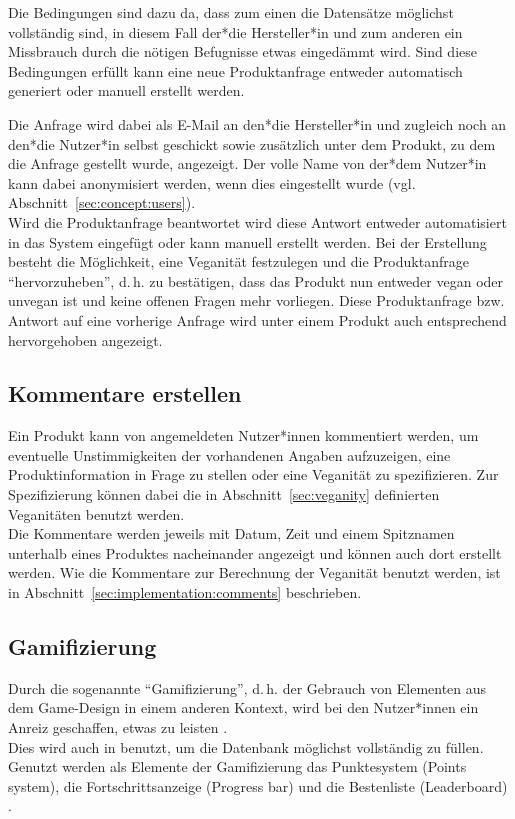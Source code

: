 Die Bedingungen sind dazu da, dass zum einen die Datensätze möglichst
vollständig sind, in diesem Fall der*die Hersteller*in und zum anderen
ein Missbrauch durch die nötigen Befugnisse etwas eingedämmt wird.
Sind diese Bedingungen erfüllt kann eine neue Produktanfrage entweder 
automatisch generiert oder manuell erstellt werden.

Die Anfrage wird dabei als E-Mail an den*die
Hersteller*in
und zugleich noch an den*die Nutzer*in selbst geschickt
sowie zusätzlich unter dem Produkt, zu
dem die Anfrage gestellt wurde, angezeigt.
Der volle Name von der*dem 
Nutzer*in kann dabei anonymisiert werden, wenn dies eingestellt wurde (vgl. 
Abschnitt~\ref{sec:concept:users}).\\
Wird die Produktanfrage beantwortet wird diese Antwort entweder automatisiert
in das System eingefügt oder kann manuell erstellt werden.
Bei der Erstellung besteht die Möglichkeit, eine Veganität festzulegen und die
Produktanfrage "`hervorzuheben"', d.\,h. zu bestätigen, dass das
Produkt nun entweder vegan oder unvegan ist und keine offenen Fragen
mehr vorliegen. Diese Produktanfrage bzw. Antwort auf eine vorherige
Anfrage wird unter einem Produkt auch entsprechend hervorgehoben
angezeigt.

\subsection{Kommentare erstellen}
\label{sec:concept:comments}

Ein Produkt kann von angemeldeten Nutzer*innen kommentiert werden, um
eventuelle Unstimmigkeiten der vorhandenen Angaben aufzuzeigen, eine 
Produktinformation in
Frage zu stellen oder eine Veganität zu spezifizieren.
Zur Spezifizierung können dabei die in Abschnitt~\ref{sec:veganity}
definierten Veganitäten benutzt werden.\\
Die Kommentare werden jeweils mit Datum, Zeit und einem Spitznamen
unterhalb eines Produktes nacheinander
angezeigt und können auch dort erstellt werden.
Wie die Kommentare zur Berechnung der Veganität benutzt werden, ist in
Abschnitt~\ref{sec:implementation:comments} beschrieben.

\subsection{Gamifizierung}
\label{sec:concept:gamification}

Durch die sogenannte "`Gamifizierung"', d.\,h. der Gebrauch von
Elementen aus dem Game-Design in einem anderen Kontext, wird bei den
Nutzer*innen ein Anreiz geschaffen, etwas zu leisten
\cite{chi:gamification-1, chi:gamification-2, sander11}.\\
Dies wird auch in \name benutzt, um
die Datenbank möglichst vollständig zu füllen.\\
Genutzt werden als Elemente der Gamifizierung das Punktesystem (Points system), 
die Fortschrittsanzeige (Progress bar)
und die Bestenliste (Leaderboard) \cite{rta13}.

